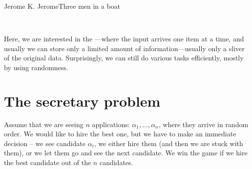 
%



%
{Jerome K. Jerome}{Three men in a boat}


\noindent%
\ChapterPrefix{}%
\ChapterGen{}

~


\bigskip%


Here, we are interested in the ---where the input
arrives one item at a time, and usually we can store only a limited amount
of information---usually only a sliver of the original data.  Surprisingly,
we can still do various tasks efficiently, mostly by using randomness.


\section{The secretary problem}

Assume that we are seeing $n$ applications: $\alpha_1, \ldots, \alpha_n$, where they
arrive in random order. We would like to hire the best one, but we have
to make an immediate decision -- we see candidate $\alpha_i$, we either hire
them (and then we are stuck with them), or we let them go and see the
next candidate. We win the game if we hire the best candidate out of the
$n$ candidates.


